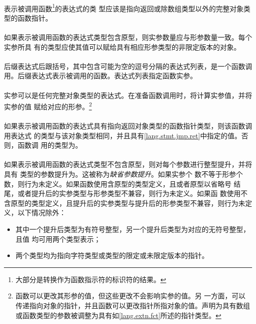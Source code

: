 {\paragraph{}
表示被调用函数\footnote{大部分是转换作为函数指示符的标识符的结果。}的表达式的类
型应该是指向返回或除数组类型以外的完整对象类型的函数指针。

\paragraph{}
如果表示被调用函数的表达式类型包含原型，则实参数量应与形参数量一致。每个实参所具
有的类型应使其值可以赋给具有相应形参类型的非限定版本的对象。

\semantic
\paragraph{}
后缀表达式后跟括号\tm{()}，其中包含可能为空的逗号分隔的表达式列表，是一个函数调
用。后缀表达式表示被调用的函数。表达式列表指定函数实参。

\paragraph{}
实参可以是任何完整对象类型的表达式。在准备函数调用时，将计算实参值，并将实参的值
赋给对应的形参。\footnote{函数可以更改其形参的值，但这些更改不会影响实参的值。另
一方面，可以传递指向对象的指针，并且函数可以更改指针所指对象的值。声明为具有数组
或函数类型的参数被调整为具有如\ref{lang.extn.fct}所述的指针类型。}

\paragraph{}
如果表示被调用函数的表达式具有指向返回对象类型的函数指针类型，则该函数调用表达式
的类型与该对象类型相同，并且具有\ref{lang.stmt.jmp.ret}中指定的值。否则，函数调
用的类型为。

\paragraph{}
如果表示被调用函数的表达式类型不包含原型，则对每个参数进行整型提升，并将具有
类型的参数提升为。这被称为\textit{缺省参数提升}。如果实参个
数不等于形参个数，则行为未定义。如果函数使用含原型的类型定义，且或者原型以省略号
\tm{(, \ldots)}结尾，或者提升后的实参类型与形参类型不兼容，则行为未定义。如果函
数使用不含原型的类型定义，且提升后的实参类型与提升后的形参类型不兼容，则行为未定
义，以下情况除外：
\begin{itemize}
  \item{其中一个提升后类型为有符号整型，另一个提升后类型为对应的无符号整型，且值
    均可用两个类型表示；}
  \item{两个类型均为指向字符类型或类型的限定或未限定版本的指针。}
\end{itemize}

}
